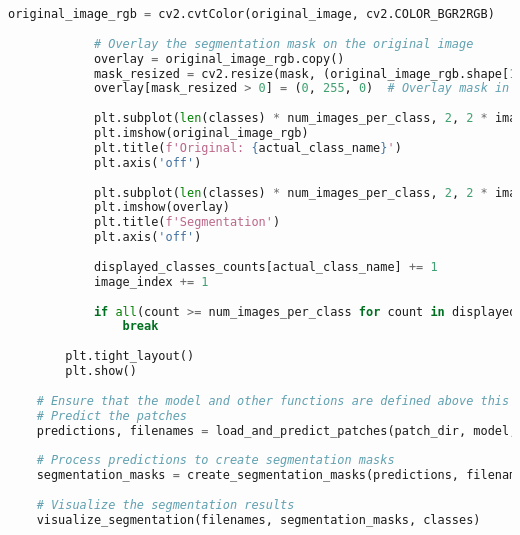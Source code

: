 \begin{lstlisting}[language=Python]
            original_image_rgb = cv2.cvtColor(original_image, cv2.COLOR_BGR2RGB)
    
            # Overlay the segmentation mask on the original image
            overlay = original_image_rgb.copy()
            mask_resized = cv2.resize(mask, (original_image_rgb.shape[1], original_image_rgb.shape[0]))  # Resize mask to match the original image size
            overlay[mask_resized > 0] = (0, 255, 0)  # Overlay mask in green color
    
            plt.subplot(len(classes) * num_images_per_class, 2, 2 * image_index + 1)
            plt.imshow(original_image_rgb)
            plt.title(f'Original: {actual_class_name}')
            plt.axis('off')
    
            plt.subplot(len(classes) * num_images_per_class, 2, 2 * image_index + 2)
            plt.imshow(overlay)
            plt.title(f'Segmentation')
            plt.axis('off')
    
            displayed_classes_counts[actual_class_name] += 1
            image_index += 1
    
            if all(count >= num_images_per_class for count in displayed_classes_counts.values()):
                break
    
        plt.tight_layout()
        plt.show()
    
    # Ensure that the model and other functions are defined above this code
    # Predict the patches
    predictions, filenames = load_and_predict_patches(patch_dir, model, classes)
    
    # Process predictions to create segmentation masks
    segmentation_masks = create_segmentation_masks(predictions, filenames, patch_size, image_size)
    
    # Visualize the segmentation results
    visualize_segmentation(filenames, segmentation_masks, classes)
\end{lstlisting}


